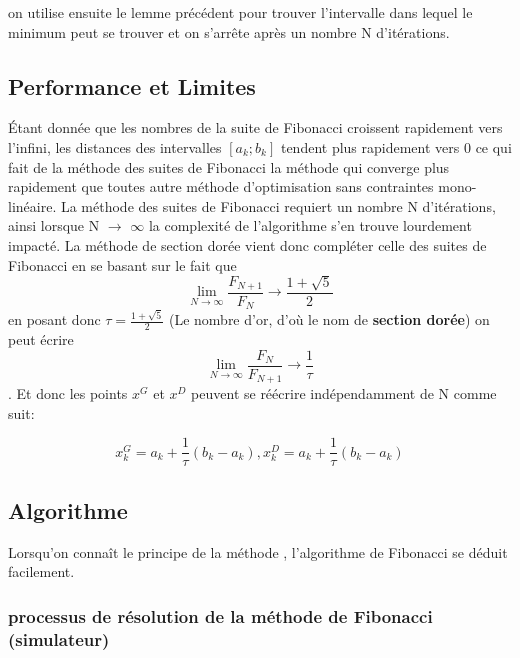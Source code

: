\documentclass[a4paper,13pt]{article}
\begin{document}
on utilise ensuite le lemme précédent pour trouver l'intervalle dans lequel le minimum peut se trouver et on s'arrête après un nombre N d'itérations.

\subsection{Performance et Limites}

Étant donnée que les nombres de la suite de Fibonacci croissent rapidement vers l'infini, les distances des intervalles $[a_{k}; b_{k}]$ tendent plus rapidement vers 0 ce qui fait de la méthode des suites de Fibonacci la méthode qui converge plus rapidement que toutes autre méthode d'optimisation sans contraintes mono-linéaire.
La méthode des suites de Fibonacci requiert un nombre N d’itérations, ainsi lorsque N $\longrightarrow$ $\infty$ la complexité de l'algorithme s'en trouve lourdement impacté. La méthode de section dorée vient donc compléter celle des suites de Fibonacci en se basant sur le fait que \[\lim_{N\rightarrow\infty} \frac{F_{N+1}}{F_{N}} \longrightarrow \frac{1+\sqrt{5}}{2}\] en posant donc $\tau = \frac{1+\sqrt{5}}{2}$ (Le nombre d'or, d’où le nom de \textbf{section dorée}) on peut écrire \[\lim_{N\rightarrow\infty} \frac{F_{N}}{F_{N+1}} \longrightarrow \frac{1}{\tau}\]. Et donc les points $x^{G}$ et $x^{D}$ peuvent se réécrire indépendamment de N comme suit:

\[
	x^{G}_{k} = a_{k} + \frac{1}{\tau}(b_{k} - a_{k}), x^{D}_{k} = a_{k} + \frac{1}{\tau}(b_{k} - a_{k})
\]

\subsection{Algorithme}

Lorsqu'on connaît le principe de la méthode , l'algorithme de Fibonacci se déduit facilement.

\subsubsection{processus de résolution de la méthode de Fibonacci (simulateur)}
\end{document}
